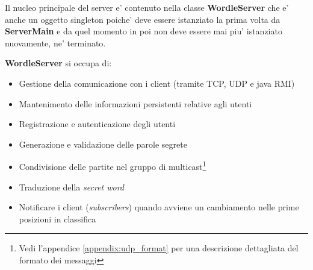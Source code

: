 \bigskip

Il nucleo principale del server e' contenuto nella classe \textbf{WordleServer} che e' anche un oggetto singleton poiche' deve essere istanziato la prima volta da \textbf{ServerMain} e da quel momento in poi non deve essere mai piu' istanziato nuovamente, ne' terminato.

\newpage

\textbf{WordleServer} si occupa di:
\begin{itemize}
	\item Gestione della comunicazione con i client (tramite TCP, UDP e java RMI)
	\item Mantenimento delle informazioni persistenti relative agli utenti
	\item Registrazione e autenticazione degli utenti
	\item Generazione e validazione delle parole segrete
	\item Condivisione delle partite nel gruppo di multicast\footnote{Vedi l'appendice \ref{appendix:udp_format} per una descrizione dettagliata del formato dei messaggi}
	\item Traduzione della \emph{secret word}
	\item Notificare i client (\emph{subscribers}) quando avviene un cambiamento nelle prime posizioni in classifica
\end{itemize}

